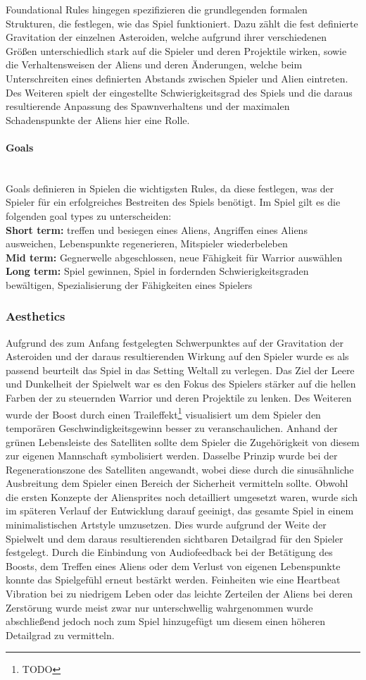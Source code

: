 \documentclass[11pt]{scrartcl}
\newcommand{\lbparagraph}[1]{\paragraph*{#1}\mbox{}\\}
\begin{document}
Foundational Rules hingegen spezifizieren die grundlegenden formalen Strukturen, die festlegen, wie das Spiel funktioniert\cite{K2011}. Dazu zählt die fest definierte Gravitation der einzelnen Asteroiden, welche aufgrund ihrer verschiedenen Größen unterschiedlich stark auf die Spieler und deren Projektile wirken, sowie die Verhaltensweisen der Aliens und deren Änderungen, welche beim Unterschreiten eines definierten Abstands zwischen Spieler und Alien eintreten. Des Weiteren spielt der eingestellte Schwierigkeitsgrad des Spiels und die daraus resultierende Anpassung des Spawnverhaltens und der maximalen Schadenspunkte der Aliens hier eine Rolle.
\lbparagraph{Goals}
Goals definieren in Spielen die wichtigsten Rules, da diese festlegen, was der Spieler für ein erfolgreiches Bestreiten des Spiels benötigt\cite[~p.145]{S2014}. Im Spiel gilt es die folgenden goal types zu unterscheiden: \\
\textbf{Short term:} treffen und besiegen eines Aliens, Angriffen eines Aliens ausweichen, Lebenspunkte regenerieren, Mitspieler wiederbeleben \\
\textbf{Mid term:} Gegnerwelle abgeschlossen, neue Fähigkeit für Warrior auswählen \\
\textbf{Long term:} Spiel gewinnen, Spiel in fordernden Schwierigkeitsgraden bewältigen, Spezialisierung der Fähigkeiten eines Spielers

\subsubsection{Aesthetics}
Aufgrund des zum Anfang festgelegten Schwerpunktes auf der Gravitation der Asteroiden und der daraus resultierenden Wirkung auf den Spieler wurde es als passend beurteilt das Spiel in das Setting Weltall zu verlegen. Das Ziel der Leere und Dunkelheit der Spielwelt war es den Fokus des Spielers stärker auf die hellen Farben der zu steuernden Warrior und deren Projektile zu lenken. Des Weiteren wurde der Boost durch einen Traileffekt\footnote{TODO} visualisiert um dem Spieler den temporären Geschwindigkeitsgewinn besser zu veranschaulichen. Anhand der grünen Lebensleiste des Satelliten sollte dem Spieler die Zugehörigkeit von diesem zur eigenen Mannschaft symbolisiert werden. Dasselbe Prinzip wurde bei der Regenerationszone des Satelliten angewandt, wobei diese durch die sinusähnliche Ausbreitung dem Spieler einen Bereich der Sicherheit vermitteln sollte. 
Obwohl die ersten Konzepte der Aliensprites noch detailliert umgesetzt waren, wurde sich im späteren Verlauf der Entwicklung darauf geeinigt, das gesamte Spiel in einem minimalistischen Artstyle umzusetzen. Dies wurde aufgrund der Weite der Spielwelt und dem daraus resultierenden sichtbaren Detailgrad für den Spieler festgelegt.
Durch die Einbindung von Audiofeedback bei der Betätigung des Boosts, dem Treffen eines Aliens oder dem Verlust von eigenen Lebenspunkte konnte das Spielgefühl erneut bestärkt werden. Feinheiten wie eine Heartbeat Vibration bei zu niedrigem Leben oder das leichte Zerteilen der Aliens bei deren Zerstörung wurde meist zwar nur unterschwellig wahrgenommen wurde abschließend jedoch noch zum Spiel hinzugefügt um diesem einen höheren Detailgrad zu vermitteln.
\end{document}

